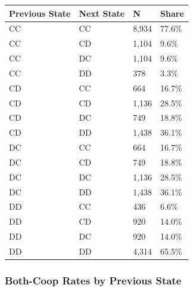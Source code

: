 \documentclass[
]{article}
\begin{document}
\begin{longtable}[]{@{}llll@{}}
\toprule\noalign{}
Previous State & Next State & N & Share \\
\midrule\noalign{}
\endhead
\bottomrule\noalign{}
\endlastfoot
CC & CC & 8,934 & 77.6\% \\
CC & CD & 1,104 & 9.6\% \\
CC & DC & 1,104 & 9.6\% \\
CC & DD & 378 & 3.3\% \\
CD & CC & 664 & 16.7\% \\
CD & CD & 1,136 & 28.5\% \\
CD & DC & 749 & 18.8\% \\
CD & DD & 1,438 & 36.1\% \\
DC & CC & 664 & 16.7\% \\
DC & CD & 749 & 18.8\% \\
DC & DC & 1,136 & 28.5\% \\
DC & DD & 1,438 & 36.1\% \\
DD & CC & 436 & 6.6\% \\
DD & CD & 920 & 14.0\% \\
DD & DC & 920 & 14.0\% \\
DD & DD & 4,314 & 65.5\% \\
\end{longtable}

\subsubsection{Both-Coop Rates by Previous
State}\label{both-coop-rates-by-previous-state}
\end{document}
